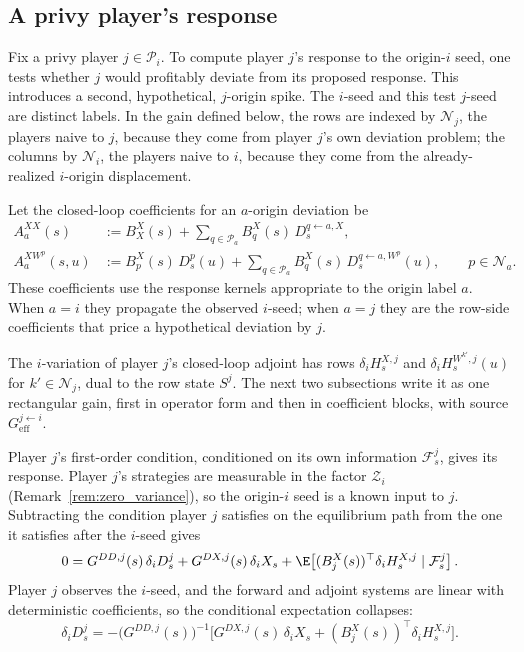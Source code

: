 \subsection{A privy player's response}

Fix a privy player $j\in \mathcal P_i$.  To compute player $j$'s response to the origin-$i$ seed, one tests whether $j$ would profitably deviate from its proposed response.  This introduces a second, hypothetical, $j$-origin spike.  The $i$-seed and this test $j$-seed are distinct labels.  In the gain defined below, the rows are indexed by $\mathcal N_j$, the players naive to $j$, because they come from player $j$'s own deviation problem; the columns by $\mathcal N_i$, the players naive to $i$, because they come from the already-realized $i$-origin displacement.

Let the closed-loop coefficients for an $a$-origin deviation be
\begin{equation}\label{eq:effective_coefficients_general}
\begin{aligned}
    A^{XX}_a(s)
    &:=B^X_X(s)+\sum_{q\in \mathcal P_a}B^X_q(s)\,D^{q\leftarrow a,X}_s,\\
    A^{XW^p}_a(s,u)
    &:=B^X_p(s)\,D^p_s(u)+\sum_{q\in \mathcal P_a}B^X_q(s)\,D^{q\leftarrow a,W^p}_s(u),
    \qquad p\in \mathcal N_a.
\end{aligned}
\end{equation}
These coefficients use the response kernels appropriate to the origin label $a$.  When $a=i$ they propagate the observed $i$-seed; when $a=j$ they are the row-side coefficients that price a hypothetical deviation by $j$.

The $i$-variation of player $j$'s closed-loop adjoint has rows $\delta_i H^{X,j}_s$ and $\delta_i H^{W^{k'},j}_s(u)$ for $k'\in \mathcal N_j$, dual to the row state $S^j$.  The next two subsections write it as one rectangular gain, first in operator form and then in coefficient blocks, with source $G_{\mathrm{eff}}^{j\leftarrow i}$.

Player $j$'s first-order condition, conditioned on its own information $\mathcal F^j_s$, gives its response.  Player $j$'s strategies are measurable in the factor $\mathcal Z_i$ (Remark~\ref{rem:zero_variance}), so the origin-$i$ seed is a known input to $j$.  Subtracting the condition player $j$ satisfies on the equilibrium path from the one it satisfies after the $i$-seed gives
\begin{equation}\label{eq:privy_projected_response_foc}
    0
    =G^{DD,j}(s)\,\delta_iD^j_s
     +G^{DX,j}(s)\,\delta_iX_s
     +\E\!\left[
        (B^X_j(s))^\top\delta_iH^{X,j}_s
        \mid \mathcal F^{j}_s
      \right].
\end{equation}
Player $j$ observes the $i$-seed, and the forward and adjoint systems are linear with deterministic coefficients, so the conditional expectation collapses:
\begin{equation}\label{eq:full_privy_response}
\boxed{
    \delta_iD^j_s=-\big(G^{DD,j}(s)\big)^{-1}\big[G^{DX,j}(s)\,\delta_iX_s+(B^X_j(s))^\top\delta_iH^{X,j}_s\big] .
}
\end{equation}

